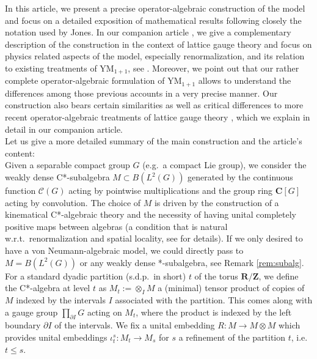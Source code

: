 \documentclass[a4paper,12pt]{amsart}
\numberwithin{equation}{section}
\theoremstyle{definition}
\newcommand{\scrC}{\mathscr C}
\newcommand{\C}{\mathbf C}
\newcommand{\ot}{\otimes}\newcommand{\otmin}{\otimes_{\text{min}}}
\newcommand{\R}{\mathbf{R}}
\newcommand{\Z}{\mathbf{Z}}
\begin{document}
In this article, we present a precise operator-algebraic construction of the model and focus on a detailed exposition of mathematical results following closely the notation used by Jones. In our companion article \cite{Brot-Stottmeister-Phys}, we give a complementary description of the construction in the context of lattice gauge theory and focus on physics related aspects of the model, especially renormalization, and its relation to existing treatments of YM$_{1+1}$, see \cite{Dimock-96-Yang-Mills, Ashtekar-97-Yang-Mills, Driver-99-Yang-Mills}. Moreover, we point out that our rather complete operator-algebraic formulation of YM$_{1+1}$ allows to understand the differences among those previous accounts in a very precise manner. Our construction also bears certain similarities as well as critical differences to more recent operator-algebraic treatments of lattice gauge theory \cite{Grundling-Rudolph-13-Infinite-Lattice-QCD, Grundling-Rudolph-17-Dynamics-QCD, Arici-Stienstra-Suijekom18}, which we explain in detail in our companion article.\\[0.25cm]
Let us give a more detailed summary of the main construction and the article's content:\\[0.1cm]
Given a separable compact group $G$ (e.g.~a compact Lie group), we consider the weakly dense C*-subalgebra $M\subset B(L^2(G))$ generated by the continuous function $\scrC(G)$ acting by pointwise multiplications and the group ring $\C[G]$ acting by convolution.
The choice of $M$ is driven by the construction of a kinematical C*-algebraic theory and the necessity of having unital completely positive maps between algebras (a condition that is natural w.r.t.~renormalization and spatial locality, see {\cite[Sections 2.3 and 4]{Brot-Stottmeister-Phys}} for details).
If we only desired to have a von Neumann-algebraic model, we could directly pass to $M=B(L^2(G))$ or any weakly dense *-subalgebra, {see Remark \ref{rem:subalg}.}
For a standard dyadic partition (s.d.p.~in short) $t$ of the torus $\R/\Z$, we define the C*-algebra at level $t$ as $M_t:=\ot_I M$ a (minimal) tensor product of copies of $M$ indexed by the intervals $I$ associated with the partition.
This comes along with a gauge group $\prod_{\partial I} G$ acting on $M_t$, where the product is indexed by the left boundary $\partial I$ of the intervals. 
We fix a unital embedding $R:M\to M\ot M$ which provides unital embeddings $\iota_t^s:M_t\to M_s$ for $s$ a refinement of the partition $t$, i.e.~$t\leq s.$
\end{document}
